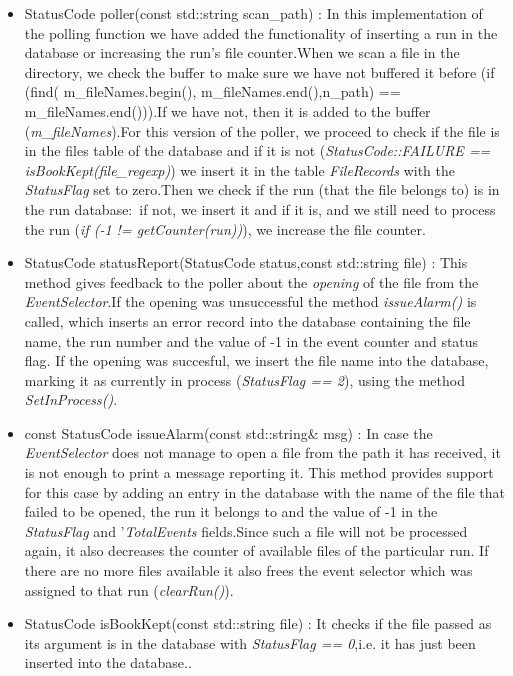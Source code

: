 \begin{itemize}
\item StatusCode poller(const std::string scan\_path) : In this implementation of the polling function we have added the functionality of inserting a run in the database or increasing the run's file counter.When we scan a file in the directory, we check the buffer to make sure we have not buffered it before (if (find( m\_fileNames.begin(),  m\_fileNames.end(),n\_path) ==  m\_fileNames.end())).If we have not, then it is added to the buffer (\textit{m\_fileNames}).For this version of the poller, we proceed to check if the file is in the files table of the database and if it is not (\textit{StatusCode::FAILURE == isBookKept(file\_regexp)}) we insert it in the table \textit{FileRecords} with the \textit{StatusFlag} set to zero.Then we check if the run (that the file belongs to) is in the run database:~if not, we insert it and if it is, and we still need to process the run (\textit{if (-1 != getCounter(run))}), we increase the file counter.\par

\item StatusCode statusReport(StatusCode status,const std::string file) : This method gives feedback to the poller about the \textit{opening} of the file from the \textit{EventSelector}.If the opening was unsuccessful the method \textit{issueAlarm()} is called, which inserts an error record into the database containing the file name, the run number and the value of -1 in the event counter and status flag. If the opening was succesful, we insert the file name into the database, marking it as currently in process (\textit{StatusFlag == 2}), using the method \textit{SetInProcess()}.\par

\item const StatusCode issueAlarm(const std::string& msg) : In case the \textit{EventSelector} does not manage to open a file from the path it has received, it is not enough to print a message reporting it. This method provides support for this case by adding an entry in the database with the name of the file that failed to be opened, the run it belongs to and the value of -1 in the \textit{StatusFlag} and '\textit{TotalEvents} fields.Since such a file will not be processed again, it also decreases the counter of available files of the particular run. If there are no more files available it also frees the event selector which was assigned to that run (\textit{clearRun()}).\par

\item StatusCode isBookKept(const std::string file) : It checks if the file passed as its argument is in the database with \textit{StatusFlag == 0},i.e. it has just been inserted into the database..\par


\end{itemize}
